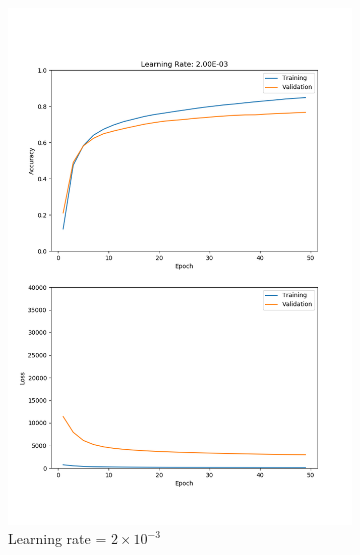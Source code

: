 \documentclass[11pt]{article}
\begin{document}
\begin{figure}[h!]
\begin{subfigure}{.325\textwidth}
      \includegraphics[width=.95\linewidth]{../results/q3_1_2_2E-03.png}
      \caption{Learning rate = $2\times10^{-3}$}
    \end{subfigure}
    \begin{subfigure}{.325\textwidth}
      \centering

\end{subfigure}
\end{figure}
\end{document}
